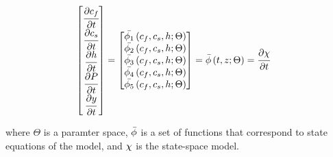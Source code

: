 \documentclass[../Article_Model_Parameters.tex]{subfiles}
\begin{document}
		{\footnotesize
			\begin{align}
				\begin{bmatrix}
					\cfrac{\partial c_f}{\partial t}\\
					\cfrac{\partial c_s}{\partial t}\\
					\cfrac{\partial {\color{black}h}}{\partial t} \\
					\cfrac{\partial P}{\partial t} \\
					\cfrac{\partial {\color{black}y}}{\partial t} 
				\end{bmatrix}
				& =
				\begin{bmatrix}
					{\color{black}\bar{\phi_1}} \left( c_f,c_s,{\color{black}h}; \Theta \right)\\
					{\color{black}\bar{\phi_2}} \left( c_f,c_s,{\color{black}h}; \Theta \right)\\
					{\color{black}\bar{\phi_3}} \left( c_f,c_s,{\color{black}h}; \Theta \right) \\
					{\color{black}\bar{\phi_4}} \left( c_f,c_s,{\color{black}h}; \Theta \right)\\
					{\color{black}\bar{\phi_5}} \left( c_f,c_s,{\color{black}h}; \Theta \right)
				\end{bmatrix} = {\color{black}\bar{\phi}} \left( t,z; \Theta \right) = \cfrac{\partial {\color{black}\chi}}{\partial t}
		\end{align} }
			
		where $\Theta$ is a paramter space, ${\color{black}\bar{\phi}}$ is a set of functions that correspond to state equations of the model, and ${\color{black}\chi}$ is the state-space model.
		
		\fi
		
			
						
\end{document}
